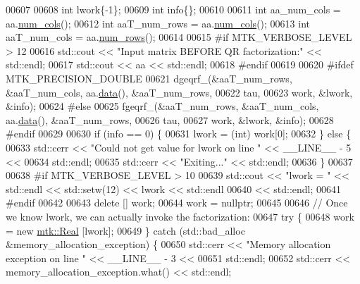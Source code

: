 \begin{DoxyCode}
00607 
00608   \textcolor{keywordtype}{int} lwork\{-1\};
00609   \textcolor{keywordtype}{int} info\{\};
00610 
00611   \textcolor{keywordtype}{int} aa\_num\_cols = aa.\hyperlink{classmtk_1_1DenseMatrix_a41747502d468c6728a4be31501b16e0e}{num\_cols}();
00612   \textcolor{keywordtype}{int} aaT\_num\_rows = aa.\hyperlink{classmtk_1_1DenseMatrix_a41747502d468c6728a4be31501b16e0e}{num\_cols}();
00613   \textcolor{keywordtype}{int} aaT\_num\_cols = aa.\hyperlink{classmtk_1_1DenseMatrix_a53f3afb3b6a8d21854458aaa9663cc74}{num\_rows}();
00614 
00615 \textcolor{preprocessor}{  #if MTK\_VERBOSE\_LEVEL > 12}
00616   std::cout << \textcolor{stringliteral}{"Input matrix BEFORE QR factorization:"} << std::endl;
00617   std::cout << aa << std::endl;
00618 \textcolor{preprocessor}{  #endif}
00619 
00620 \textcolor{preprocessor}{  #ifdef MTK\_PRECISION\_DOUBLE}
00621   dgeqrf\_(&aaT\_num\_rows, &aaT\_num\_cols, aa.\hyperlink{classmtk_1_1DenseMatrix_a0c33b8a9e01d157c61ddbdf807c25d84}{data}(), &aaT\_num\_rows,
00622           tau,
00623           work, &lwork, &info);
00624 \textcolor{preprocessor}{  #else}
00625   fgeqrf\_(&aaT\_num\_rows, &aaT\_num\_cols, aa.\hyperlink{classmtk_1_1DenseMatrix_a0c33b8a9e01d157c61ddbdf807c25d84}{data}(), &aaT\_num\_rows,
00626           tau,
00627           work, &lwork, &info);
00628 \textcolor{preprocessor}{  #endif}
00629 
00630   \textcolor{keywordflow}{if} (info == 0) \{
00631     lwork = (int) work[0];
00632   \} \textcolor{keywordflow}{else} \{
00633     std::cerr << \textcolor{stringliteral}{"Could not get value for lwork on line "} << \_\_LINE\_\_ - 5 <<
00634       std::endl;
00635     std::cerr << \textcolor{stringliteral}{"Exiting..."} << std::endl;
00636   \}
00637 
00638 \textcolor{preprocessor}{  #if MTK\_VERBOSE\_LEVEL > 10}
00639   std::cout << \textcolor{stringliteral}{"lwork = "} << std::endl << std::setw(12) << lwork << std::endl
00640     << std::endl;
00641 \textcolor{preprocessor}{  #endif}
00642 
00643   \textcolor{keyword}{delete} [] work;
00644   work = \textcolor{keyword}{nullptr};
00645 
00646   \textcolor{comment}{// Once we know lwork, we can actually invoke the factorization:}
00647   \textcolor{keywordflow}{try} \{
00648     work = \textcolor{keyword}{new} \hyperlink{group__c01-roots_gac080bbbf5cbb5502c9f00405f894857d}{mtk::Real} [lwork];
00649   \} \textcolor{keywordflow}{catch} (std::bad\_alloc &memory\_allocation\_exception) \{
00650     std::cerr << \textcolor{stringliteral}{"Memory allocation exception on line "} << \_\_LINE\_\_ - 3 <<
00651       std::endl;
00652     std::cerr << memory\_allocation\_exception.what() << std::endl;

\end{DoxyCode}
